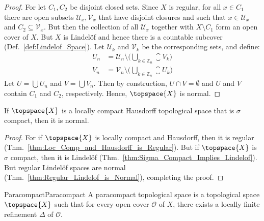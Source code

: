\documentclass{article}                                                        %
\begin{document}
            \begin{proof}
                For let $C_{1},C_{2}$ be disjoint closed sets. Since
                $X$ is regular, for all $x\in{C}_{1}$ there are open subsets
                $\mathcal{U}_{x},\mathcal{V}_{x}$ that have disjoint closures
                and such that $x\in\mathcal{U}_{x}$ and
                $C_{2}\subseteq\mathcal{V}_{x}$. But then the collection of all
                $\mathcal{U}_{x}$ together with $X\setminus{C}_{1}$ form an open
                cover of $X$. But $X$ is Lindel\"{o}f and hence there is a
                countable subcover (Def.~\ref{def:Lindelof_Space}). Let
                $\mathcal{U}_{k}$ and $\mathcal{V}_{k}$ be the corresponding
                sets, and define:
                \begin{align}
                    U_{n}&=\mathcal{U}_{n}\setminus\Big(
                        \bigcup_{k\in\mathbb{Z}_{n}}\closure{V_{k}}
                    \Big)\\
                    V_{n}&=\mathcal{V}_{n}\setminus\Big(
                        \bigcup_{k\in\mathbb{Z}_{n}}\closure{U_{k}}
                    \Big)
                \end{align}
                Let $U=\bigcup{U}_{n}$ and $V=\bigcup{V}_{n}$. Then by
                construction, $U\cap{V}=\emptyset$ and $U$ and $V$ contain
                $C_{1}$ and $C_{2}$, respectively. Hence, $\topspace{X}$ is
                normal.
            \end{proof}
            \begin{theorem}
                \label{thm:Sigma_Compact_Loc_Compact_Hausdorff_is_Normal}%
                If $\topspace{X}$ is a locally compact Hausdorff topological
                space that is $\sigma$ compact, then it is normal.
            \end{theorem}
            \begin{proof}
                For if $\topspace{X}$ is locally compact and Hausdorff, then it
                is regular (Thm.~\ref{thm:Loc_Comp_and_Hausdorff_is_Regular}).
                But if $\topspace{X}$ is $\sigma$ compact, then it is
                Lindel\"{o}f (Thm.~\ref{thm:Sigma_Compact_Implies_Lindelof}).
                But regular Lindel\"{o}f spaces are normal
                (Thm.~\ref{thm:Regular_Lindelof_is_Normal}), completing the
                proof.
            \end{proof}
            \begin{fdefinition}{Paracompact}{Paracompact}
                A paracompact topological space is a topological space
                $\topspace{X}$ such that for every open cover $\mathcal{O}$ of $X$,
                there exists a locally finite refinement $\Delta$ of $\mathcal{O}$.
            \end{fdefinition}
\end{document}

